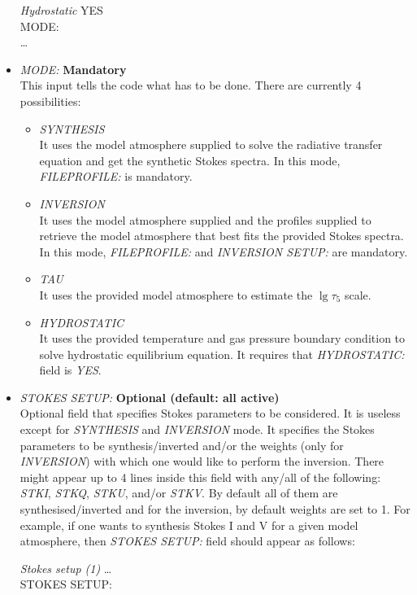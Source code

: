 \begin{itemize}
\begin{ifbox}[label={tb:hydrostatic}]{{\it Hydrostatic}}
  YES\\
  MODE:\\
  \ldots
  \normalsize
\end{ifbox}
  \item {\it MODE:} {\bf Mandatory}\\
  This input tells the code what has to be done. There are currently 4 possibilities:
  \begin{itemize}
    \item {\it SYNTHESIS}\\
    It uses the model atmosphere supplied to solve the radiative transfer equation and get the synthetic Stokes spectra. In this mode, {\it FILEPROFILE:} is mandatory.
    \item {\it INVERSION}\\
    It uses the model atmosphere supplied and the profiles supplied to retrieve the model atmosphere that best fits the provided Stokes spectra. In this mode, {\it FILEPROFILE:} and {\it INVERSION SETUP:} are mandatory.
    \item {\it TAU}\\
    It uses the provided model atmosphere to estimate the $\lg\tau_{5}$ scale.
    \item {\it HYDROSTATIC}\\
    It uses the provided temperature and gas pressure boundary condition to solve hydrostatic equilibrium equation. It requires that {\it HYDROSTATIC:} field is {\it YES}.
  \end{itemize}
  \item {\it STOKES SETUP:} {\bf Optional (default: all active)}\\
  Optional field that specifies Stokes parameters to be considered. 
  It is useless except for {\it SYNTHESIS} and {\it INVERSION} mode. It specifies the Stokes parameters to be synthesis/inverted and/or the weights (only for {\it INVERSION}) with which one would like to perform the inversion. There might appear up to 4 lines inside this field with any/all of the following: {\it STKI}, {\it STKQ}, {\it STKU}, and/or {\it STKV}. By default all of them are synthesised/inverted and for the inversion, by default weights are set to 1. For example, if one wants to synthesis Stokes I and V for a given model atmosphere, then {\it STOKES SETUP:} field should appear as follows:\\
\begin{ifbox}[label={tb:stokes_setup1}]{{\it Stokes setup (1)}}
  \scriptsize
  \ldots\\
  STOKES SETUP:\\

\end{ifbox}
\end{itemize}
